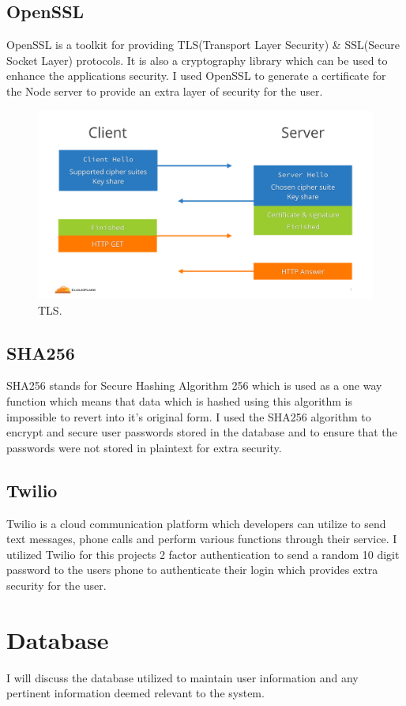 \subsection{OpenSSL}
OpenSSL is a toolkit for providing TLS(Transport Layer Security) \& SSL(Secure Socket Layer) protocols.  It is also a cryptography library which can be used to enhance the applications security.  I used OpenSSL to generate a certificate for the Node server to provide an extra layer of security for the user.
\\
\begin{figure}[H]
  \includegraphics[width=\textwidth]{img/tls.png}
  \caption{TLS.}
  \label{fig: How TLS Works}
\end{figure}
\cite{TLS}
\subsection{SHA256}
SHA256 stands for Secure Hashing Algorithm 256 which is used as a one way function which means that data which is hashed using this algorithm is impossible to revert into it's original form\cite{SHA256}.  I used the SHA256 algorithm to encrypt and secure user passwords stored in the database and to ensure that the passwords were not stored in plaintext for extra security.
\subsection{Twilio}
Twilio is a cloud communication platform which developers can utilize to send text messages, phone calls and perform various functions through their service\cite{Twilio}. I utilized Twilio for this projects 2 factor authentication to send a random 10 digit password to the users phone to authenticate their login which provides extra security for the user.
\section{Database}
I will discuss the database utilized to maintain user information and any pertinent information deemed relevant to the system.
